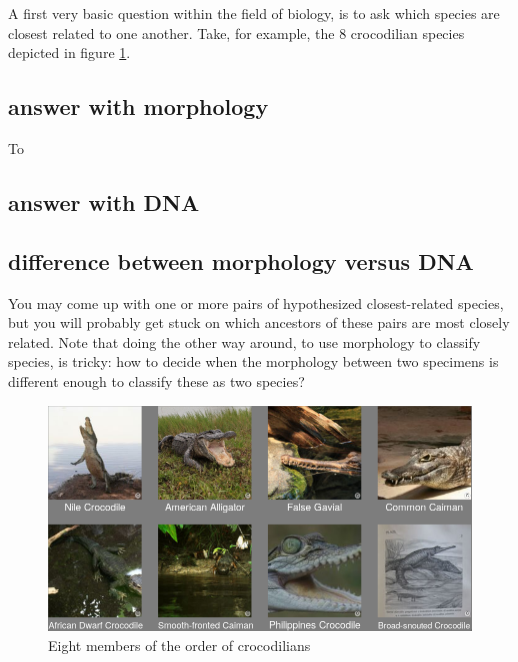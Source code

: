 A first very basic question within the field of biology,
is to ask which species are closest related to
one another. Take, for example, the 8 crocodilian species 
depicted in figure \ref{fig:crocodialians}.

\subsection{answer with morphology}

To 

\subsection{answer with DNA}


\subsection{difference between morphology versus DNA}

You may come up with one or more pairs of hypothesized closest-related species,
but you will probably get stuck on which ancestors of these pairs
are most closely related. Note that doing the other way around, to use
morphology to classify species, is tricky: how to decide when the morphology 
between two specimens is different enough to classify these as two species?

\begin{figure}[H]
  \includegraphics[width=1.0\textwidth]{crocodilians.png}
  \caption{
    Eight members of the order of crocodilians
  }
  \label{fig:crocodialians}
\end{figure}

